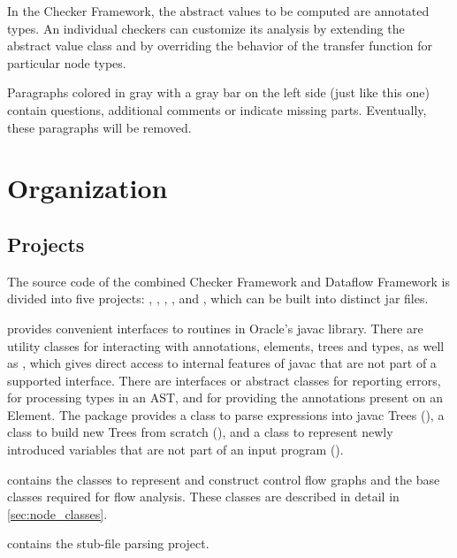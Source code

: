 In the Checker Framework, the abstract values to be computed are
annotated types.  An individual checkers can customize its analysis by
extending the abstract value class and by overriding the behavior of
the transfer function for particular node types.

\begin{workinprogress}
    Paragraphs colored in gray with a gray bar on the left side (just
    like this one) contain questions, additional comments or indicate
    missing parts. Eventually, these paragraphs will be removed.
\end{workinprogress}





\section{Organization}

\subsection{Projects}

The source code of the combined Checker Framework and Dataflow
Framework is divided into five projects: ,
, , , and ,
which can be built into distinct jar files.

 provides convenient interfaces to routines in
Oracle's javac library.  There are utility classes for interacting
with annotations, elements, trees and types, as well as
, which gives direct access to internal features
of javac that are not part of a supported interface.  There are
interfaces or abstract classes for reporting errors, for processing
types in an AST, and for providing the annotations present on an
Element.
The  package provides a
class to parse expressions into javac Trees (), a
class to build new Trees from  scratch (), and a
class to represent newly introduced variables that are not part of an
input program ().

 contains the classes to represent and construct
control flow graphs and the base classes required for flow analysis.
These classes are described in detail in \autoref{sec:node_classes}.

 contains the stub-file parsing project.

